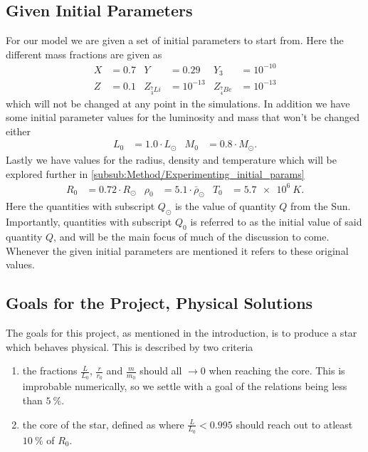 \documentclass[11pt,a4paper,twocolumn,titlepage]{article}
\begin{document}
\subsection{Given Initial Parameters} \label{subsec:Intro/Initial_params}
For our model we are given a set of initial parameters to start from. Here the different mass fractions are given as
\begin{equation}
\begin{aligned}
X&=0.7 & Y &= 0.29 & Y_3&=10^{-10} 
\\
Z&= 0.1 & Z_{^7_3Li} &= 10^{-13} & Z_{^7_4Be} &= 10^{-13} \label{eq:Mass_fractions}
\end{aligned}
\end{equation}
which will not be changed at any point in the simulations. In addition we have some initial parameter values for the luminosity and mass that won't be changed either
\begin{equation}
\begin{aligned}
L_0 &= 1.0\cdot L_\odot & M_0 &= 0.8\cdot M_\odot.\label{eq:Initial_lumen_mass}
\end{aligned}
\end{equation}
Lastly we have values for the radius, density and temperature which will be explored further in \cref{subsub:Method/Experimenting_initial_params}
\begin{align}
R_0&=0.72\cdot R_\odot & \rho_0 &= 5.1\cdot \bar{\rho}_\odot & T_0 &= \SI{5.7e6}{K}.
\end{align}
Here the quantities with subscript $Q_\odot$ is the value of quantity $Q$ from the Sun. Importantly, quantities with subscript $Q_0$ is referred to as the initial value of said quantity $Q$, and will be the main focus of much of the discussion to come. Whenever the given initial parameters are mentioned it refers to these original values.

\subsection{Goals for the Project, Physical Solutions} \label{subsec:governing/goals}
The goals for this project, as mentioned in the introduction, is to produce a star which behaves physical. This is described by two criteria
\begin{enumerate}
\item the fractions $\frac{L}{L_0}$, $\frac{r}{r_0}$ and $\frac{m}{m_0}$ should all $\rightarrow 0$ when reaching the core. This is improbable numerically, so we settle with a goal of the relations being less than $\SI{5}{\%}$.
\item the core of the star, defined as where ${\frac{L}{L_0}<0.995}$ should reach out to atleast $\SI{10}{\%}$ of $R_0$.
\end{enumerate}
\end{document}
